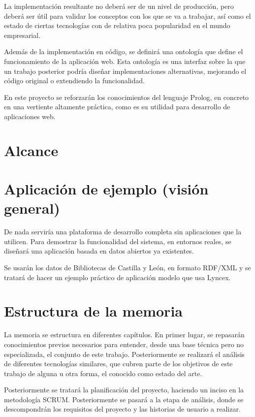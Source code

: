 \documentclass[12pt]{report} %
\begin{document}
La implementación resultante no deberá ser de un nivel de producción, pero deberá ser útil para validar los conceptos con los que se va a trabajar, así como el estado de ciertas tecnologías con de relativa poca popularidad en el mundo empresarial.

Además de la implementación en código, se definirá una ontología que define el funcionamiento de la aplicación web. Esta ontología es una interfaz sobre la que un trabajo posterior podría diseñar implementaciones alternativas, mejorando el código original o extendiendo la funcionalidad.

En este proyecto se reforzarán los conocimientos del lenguaje Prolog, en concreto en una vertiente altamente práctica, como es su utilidad para desarrollo de aplicaciones web.

\section{Alcance}

\section{Aplicación de ejemplo (visión general)}

De nada serviría una plataforma de desarrollo completa sin aplicaciones que la utilicen. Para demostrar la funcionalidad del sistema, en entornos reales, se diseñará una aplicación basada en datos abiertos ya existentes.

Se usarán los datos de Bibliotecas de Castilla y León, en formato RDF/XML y se tratará de hacer un ejemplo práctico de aplicación modelo que usa Lyncex.

\section{Estructura de la memoria}
La memoria se estructura en diferentes capítulos. En primer lugar, se repasarán conocimientos previos necesarios para entender, desde una base técnica pero no especializada, el conjunto de este trabajo. Posteriormente se realizará el análisis de diferentes tecnologías similares, que cubren parte de los objetivos de este trabajo de alguna u otra forma, el conocido como estado del arte.

Posteriormente se tratará la planificación del proyecto, haciendo un inciso en la metodología SCRUM. Posteriormente se pasará a la etapa de análisis, donde se descompondrán los requisitos del proyecto y las historias de usuario a realizar.
\end{document}
